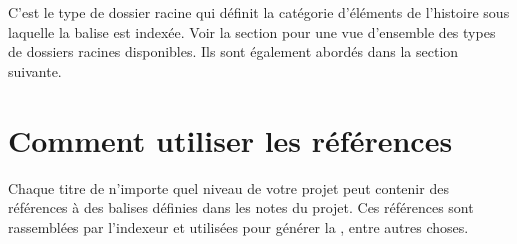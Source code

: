 \documentclass[a4paper,11pt,french]{sphinxmanual}
\begin{document}
\sphinxAtStartPar
C’est le type de dossier racine qui définit la catégorie d’éléments de l’histoire sous laquelle la balise est indexée. Voir la section {\hyperref[\detokenize{project_overview:a-proj-roots}]{}} pour une vue d’ensemble des types de dossiers racines disponibles. Ils sont également abordés dans la section suivante.


\section{Comment utiliser les références}
\label{\detokenize{project_references:how-to-use-references}}\label{\detokenize{project_references:a-references-references}}
\sphinxAtStartPar
Chaque titre de n’importe quel niveau de votre projet peut contenir des références à des balises définies dans les notes du projet. Ces références sont rassemblées par l’indexeur et utilisées pour générer la , entre autres choses.
\end{document}

